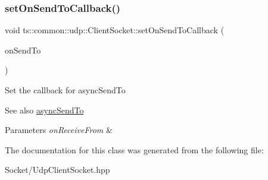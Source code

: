 \subsubsection{\texorpdfstring{set\+On\+Send\+To\+Callback()}{setOnSendToCallback()}}
{\footnotesize\ttfamily void ts\+::common\+::udp\+::\+Client\+Socket\+::set\+On\+Send\+To\+Callback (\begin{DoxyParamCaption}\item[{On\+Send\+To\+Func}]{on\+Send\+To }\end{DoxyParamCaption})}

Set the callback for async\+Send\+To \begin{DoxySeeAlso}{See also}
\hyperlink{classts_1_1common_1_1udp_1_1_client_socket_abe684b5395930b9e46cf1bd3cb8a9c32}{async\+Send\+To} 
\end{DoxySeeAlso}

\begin{DoxyParams}{Parameters}
{\em on\+Receive\+From} & \\
\hline
\end{DoxyParams}


The documentation for this class was generated from the following file\+:\begin{DoxyCompactItemize}
\item 
Socket/Udp\+Client\+Socket.\+hpp\end{DoxyCompactItemize}

